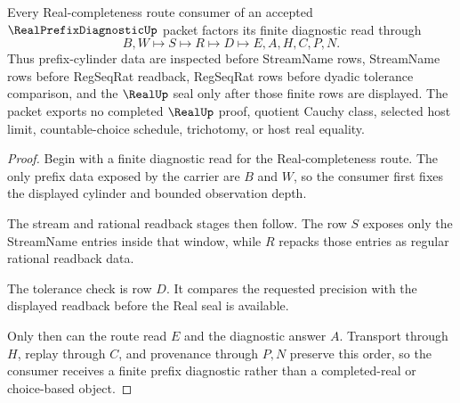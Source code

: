 \begin{theorem}
\label{thm:real-prefix-diagnostic-real-seal-readback}
Every Real-completeness route consumer of an accepted $\RealPrefixDiagnosticUp$ packet factors its finite diagnostic read through
$$
B,W \longmapsto S \longmapsto R \longmapsto D \longmapsto E,A,H,C,P,N .
$$
Thus prefix-cylinder data are inspected before StreamName rows, StreamName rows before RegSeqRat readback, RegSeqRat rows before dyadic tolerance comparison, and the $\RealUp$ seal only after those finite rows are displayed. The packet exports no completed $\RealUp$ proof, quotient Cauchy class, selected host limit, countable-choice schedule, trichotomy, or host real equality.
\end{theorem}
\begin{proof}
Begin with a finite diagnostic read for the Real-completeness route. The only prefix data exposed by the carrier are $B$ and $W$, so the consumer first fixes the displayed cylinder and bounded observation depth.

The stream and rational readback stages then follow. The row $S$ exposes only the StreamName entries inside that window, while $R$ repacks those entries as regular rational readback data.

The tolerance check is row $D$. It compares the requested precision with the displayed readback before the Real seal is available.

Only then can the route read $E$ and the diagnostic answer $A$. Transport through $H$, replay through $C$, and provenance through $P,N$ preserve this order, so the consumer receives a finite prefix diagnostic rather than a completed-real or choice-based object.
\end{proof}


\begin{closurestatus}{\RealPrefixDiagnosticUp}
  \theoryclosure{\seedClosure}
  \formalstatus{\unformalizedV}
\end{closurestatus}
